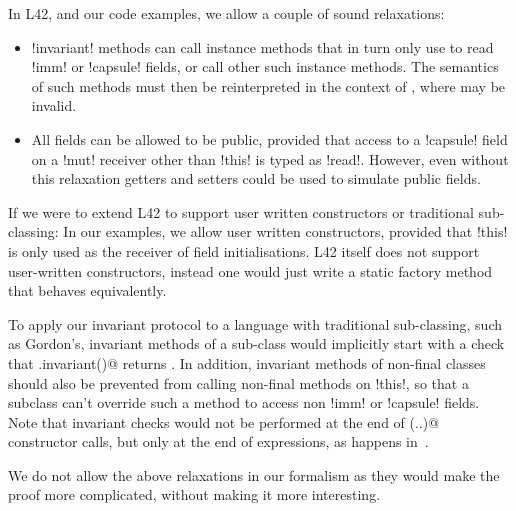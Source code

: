 In L42, and our code examples, we allow a couple of sound relaxations:
\begin{itemize}
	\item \Q!invariant! methods can call instance methods that in turn only use \Q@this@ to read \Q!imm! or \Q!capsule! fields, or call other such instance methods.
	The semantics of such methods must then be reinterpreted in the context of \Q@invariant@, where \Q@this@ may be invalid. 	
	\item All fields can be allowed to be public, provided that access to a \Q!capsule! field on a \Q!mut! receiver other than \Q!this! is typed as \Q!read!. However, even without this relaxation getters and setters could be used to simulate public fields.
\end{itemize}
\noindent If we were to extend L42 to support user written constructors or traditional sub-classing:
In our examples, we allow user written constructors, provided that \Q!this! is only used as the receiver of field initialisations. L42 itself does not support user-written constructors, instead one would just write a static factory method that behaves equivalently.

To apply our invariant protocol to a language with traditional sub-classing, such as Gordon\etal's, invariant methods of a sub-class would implicitly start with a check that \Q@super.invariant()@ returns \Q@true@. In addition, invariant methods of non-final classes should also be prevented from calling non-final methods on \Q!this!, so that a subclass can't override such a method to access non \Q!imm! or \Q!capsule! fields. Note that invariant checks would not be performed at the end of \Q@super(..)@ constructor calls, but only at the end of \Q@new@ expressions, as happens in~\cite{feldman2006jose}.

We do not allow the above relaxations in our formalism as they would make the proof more complicated, without making it more interesting.